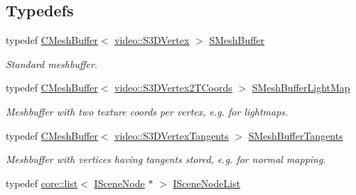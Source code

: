 \subsection*{Typedefs}
\begin{DoxyCompactItemize}
\item 
\mbox{\label{namespaceirr_1_1scene_a76de145884afd2965d09c28d6bf89616}} 
typedef \hyperlink{classirr_1_1scene_1_1CMeshBuffer}{C\+Mesh\+Buffer}$<$ \hyperlink{structirr_1_1video_1_1S3DVertex}{video\+::\+S3\+D\+Vertex} $>$ \hyperlink{namespaceirr_1_1scene_a76de145884afd2965d09c28d6bf89616}{S\+Mesh\+Buffer}
\begin{DoxyCompactList}\small\item\em Standard meshbuffer. \end{DoxyCompactList}\item 
\mbox{\label{namespaceirr_1_1scene_a0e95bd297e19ab7ab7160293b53b0584}} 
typedef \hyperlink{classirr_1_1scene_1_1CMeshBuffer}{C\+Mesh\+Buffer}$<$ \hyperlink{structirr_1_1video_1_1S3DVertex2TCoords}{video\+::\+S3\+D\+Vertex2\+T\+Coords} $>$ \hyperlink{namespaceirr_1_1scene_a0e95bd297e19ab7ab7160293b53b0584}{S\+Mesh\+Buffer\+Light\+Map}
\begin{DoxyCompactList}\small\item\em Meshbuffer with two texture coords per vertex, e.\+g. for lightmaps. \end{DoxyCompactList}\item 
\mbox{\label{namespaceirr_1_1scene_aa8137e76f0ada61f342d3de6cf07680a}} 
typedef \hyperlink{classirr_1_1scene_1_1CMeshBuffer}{C\+Mesh\+Buffer}$<$ \hyperlink{structirr_1_1video_1_1S3DVertexTangents}{video\+::\+S3\+D\+Vertex\+Tangents} $>$ \hyperlink{namespaceirr_1_1scene_aa8137e76f0ada61f342d3de6cf07680a}{S\+Mesh\+Buffer\+Tangents}
\begin{DoxyCompactList}\small\item\em Meshbuffer with vertices having tangents stored, e.\+g. for normal mapping. \end{DoxyCompactList}\item 
\mbox{\label{namespaceirr_1_1scene_ac141e7443ace16ce06c0a092c6fc4fbc}} 
typedef \hyperlink{classirr_1_1core_1_1list}{core\+::list}$<$ \hyperlink{classirr_1_1scene_1_1ISceneNode}{I\+Scene\+Node} $\ast$ $>$ \hyperlink{namespaceirr_1_1scene_ac141e7443ace16ce06c0a092c6fc4fbc}{I\+Scene\+Node\+List}

\end{DoxyCompactItemize}
